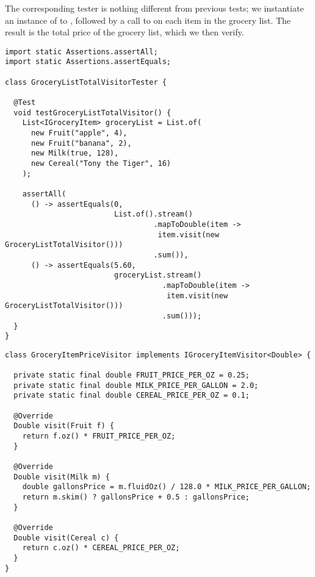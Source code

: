 The corresponding tester is nothing different from previous tests; we instantiate an instance of  to , followed by a call to  on each item in the grocery list. The result is the total price of the grocery list, which we then verify.

\begin{cl}[]{}
\begin{lstlisting}[language=MyJava]
import static Assertions.assertAll;
import static Assertions.assertEquals;

class GroceryListTotalVisitorTester {

  @Test
  void testGroceryListTotalVisitor() {
    List<IGroceryItem> groceryList = List.of(
      new Fruit("apple", 4),
      new Fruit("banana", 2),
      new Milk(true, 128),
      new Cereal("Tony the Tiger", 16)
    );

    assertAll(
      () -> assertEquals(0, 
                         List.of().stream()
                                  .mapToDouble(item -> 
                                   item.visit(new GroceryListTotalVisitor()))
                                  .sum()),
      () -> assertEquals(5.60, 
                         groceryList.stream()
                                    .mapToDouble(item -> 
                                     item.visit(new GroceryListTotalVisitor()))
                                    .sum()));
  }
}
\end{lstlisting}
\end{cl}

\begin{cl}[]{}
\begin{lstlisting}[language=MyJava]
class GroceryItemPriceVisitor implements IGroceryItemVisitor<Double> {

  private static final double FRUIT_PRICE_PER_OZ = 0.25;
  private static final double MILK_PRICE_PER_GALLON = 2.0;
  private static final double CEREAL_PRICE_PER_OZ = 0.1;

  @Override
  Double visit(Fruit f) {
    return f.oz() * FRUIT_PRICE_PER_OZ;
  }

  @Override
  Double visit(Milk m) {
    double gallonsPrice = m.fluidOz() / 128.0 * MILK_PRICE_PER_GALLON;
    return m.skim() ? gallonsPrice + 0.5 : gallonsPrice;
  }

  @Override
  Double visit(Cereal c) {
    return c.oz() * CEREAL_PRICE_PER_OZ;
  }
}
\end{lstlisting}
\end{cl}
